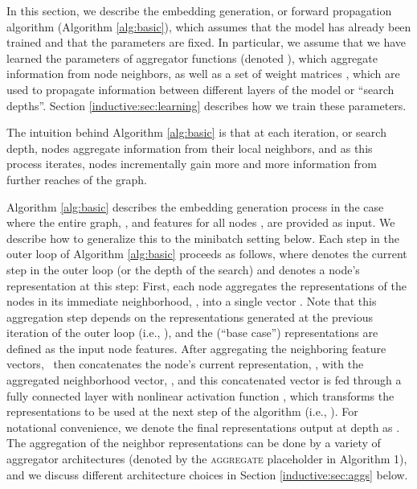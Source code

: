 In this section, we describe the embedding generation, or forward propagation algorithm (Algorithm \ref{alg:basic}), which assumes that the model has already been trained and that the parameters are fixed. 
In particular, we assume that we have learned the parameters of  aggregator functions (denoted ), which aggregate information from node neighbors, as well as a set of weight matrices , which are used to propagate information between different layers of the model or ``search depths''. 
Section \ref{inductive:sec:learning} describes how we train these parameters. 

The intuition behind Algorithm \ref{alg:basic} is that at each iteration, or search depth, nodes aggregate information from their local neighbors, and as this process iterates, nodes incrementally gain more and more information from further reaches of the graph.

Algorithm \ref{alg:basic} describes the embedding generation process in the case where the entire graph, ,  and features  for all nodes , are provided as input.
We describe how to generalize this to the minibatch setting below. 
Each step in the outer loop of Algorithm \ref{alg:basic} proceeds as follows, where  denotes the current step in the outer loop (or the depth of the search) and  denotes a node's representation at this step: First, each node  aggregates the representations of the nodes in its immediate neighborhood, , into a single vector . 
Note that this aggregation step depends on the representations generated at the previous iteration of the outer loop (i.e., ),  and the  (``base case'') representations are defined as the input node features. 
After aggregating the neighboring feature vectors, \name\ then concatenates the node's current representation, , with the aggregated neighborhood vector, , and this concatenated vector is fed through a fully connected layer with nonlinear activation function , which transforms the representations to be used at the next step of the algorithm (i.e.,  ). 
For notational convenience, we denote the final representations output at depth  as .
The aggregation of the neighbor representations can be done by a variety of aggregator architectures (denoted by the \textsc{aggregate} placeholder in Algorithm 1), and we discuss different architecture choices in Section \ref{inductive:sec:aggs} below.


